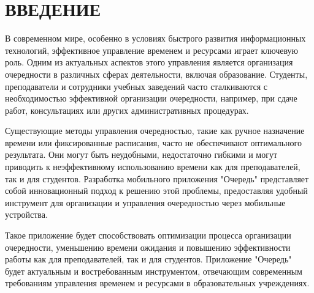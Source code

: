 \chapter*{ВВЕДЕНИЕ}

В современном мире, особенно в условиях быстрого развития информационных
технологий, эффективное управление временем и ресурсами играет ключевую роль.
Одним из актуальных аспектов этого управления является организация очередности
в различных сферах деятельности, включая образование.
Студенты, преподаватели и сотрудники учебных заведений часто сталкиваются
с необходимостью эффективной организации очередности, например,
при сдаче работ, консультациях или других административных процедурах.\par
Существующие методы управления очередностью,
такие как ручное назначение времени или фиксированные расписания,
часто не обеспечивают оптимального результата. Они могут быть неудобными,
недостаточно гибкими и могут приводить к неэффективному использованию времени
как для преподавателей, так и для студентов.
Разработка мобильного приложения "Очередь"
представляет собой инновационный подход к решению этой проблемы,
предоставляя удобный инструмент для организации
и управления очередностью через мобильные устройства.\par
Такое приложение будет способствовать оптимизации процесса
организации очередности, уменьшению времени ожидания
и повышению эффективности работы как для преподавателей,
так и для студентов. Приложение "Очередь" будет актуальным
и востребованным инструментом, отвечающим современным требованиям управления
временем и ресурсами в образовательных учреждениях.\par


